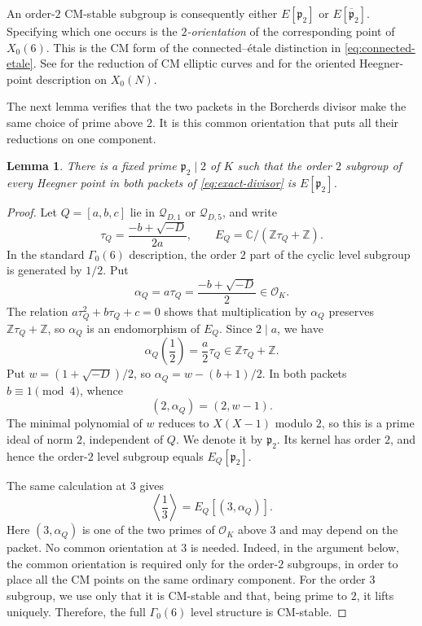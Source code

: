 \documentclass[11pt]{amsart}
\newtheorem{lemma}[theorem]{Lemma}
\theoremstyle{remark}
\numberwithin{equation}{section}
\newcommand{\C}{\mathbb C}
\newcommand{\Z}{\mathbb Z}
\newcommand{\cO}{\mathcal O}
\newcommand{\cQ}{\mathcal Q}
\begin{document}
An order-$2$ CM-stable subgroup is consequently either
$E[\mathfrak p_2]$ or $E[\overline{\mathfrak p}_2]$.  Specifying which one
occurs is the \emph{$2$-orientation} of the corresponding point of
$X_0(6)$.  This is the CM form of the connected--\'etale distinction in
\eqref{eq:connected-etale}.  See \cite[Section~14]{Cox} for the reduction of
CM elliptic curves and \cite{GrossX0N} for the oriented Heegner-point
description on $X_0(N)$.

The next lemma verifies that the two packets in the Borcherds divisor make
the same choice of prime above $2$.  It is this common orientation that puts
all their reductions on one component.

\begin{lemma}\label{lem:orientation}
 There is a fixed prime $\mathfrak p_2\mid2$ of $K$ such that the order $2$
 subgroup of every Heegner point in both packets of
 \eqref{eq:exact-divisor} is $E[\mathfrak p_2]$.
\end{lemma}

\begin{proof}
 Let $Q=[a,b,c]$ lie in $\cQ_{D,1}$ or $\cQ_{D,5}$, and write
 \[
  \tau_Q=\frac{-b+\sqrt{-D}}{2a},\qquad
  E_Q=\C/(\Z\tau_Q+\Z).
 \]
 In the standard $\Gamma_0(6)$ description, the order $2$ part of the
 cyclic level subgroup is generated by $1/2$.  Put
 \[
  \alpha_Q=a\tau_Q=\frac{-b+\sqrt{-D}}2\in\cO_K.
 \]
 The relation $a\tau_Q^2+b\tau_Q+c=0$ shows that multiplication by
 $\alpha_Q$ preserves $\Z\tau_Q+\Z$, so $\alpha_Q$ is an endomorphism of
 $E_Q$.
 Since $2\mid a$, we have
 \[
 \alpha_Q\left(\frac12\right)=\frac a2\tau_Q
 \in\Z\tau_Q+\Z.
 \]
 Put $w=(1+\sqrt{-D})/2$, so
 $\alpha_Q=w-(b+1)/2$.  In both packets $b\equiv1\pmod4$, whence
 \[
  (2,\alpha_Q)=(2,w-1).
 \]
 The minimal polynomial of $w$ reduces to $X(X-1)$ modulo $2$, so this is a
 prime ideal of norm $2$, independent of $Q$.  We denote it by
 $\mathfrak p_2$.
 Its kernel has order $2$, and hence the order-$2$ level subgroup equals
 $E_Q[\mathfrak p_2]$.

The same calculation at $3$ gives
\[
 \left\langle\frac13\right\rangle
 =E_Q[(3,\alpha_Q)].
\]
Here $(3,\alpha_Q)$ is one of the two primes of $\cO_K$ above $3$ and
may depend on the packet.  No common orientation at $3$ is needed.  Indeed, in the
argument below, the common orientation is required only for the order-$2$
subgroups, in order to place all the CM points on the same ordinary
component.  For the order $3$ subgroup, we use only that it is CM-stable
and that, being prime to $2$, it lifts uniquely.  Therefore, the full
$\Gamma_0(6)$ level structure is CM-stable.
\end{proof}
\end{document}
